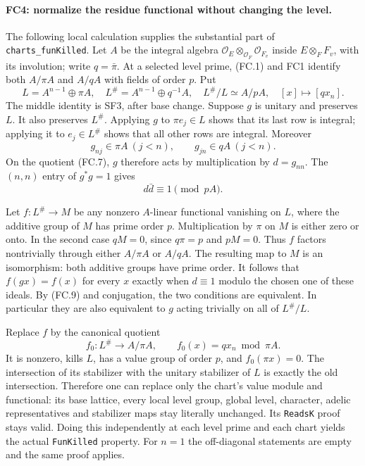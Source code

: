 \documentclass[11pt,a4paper]{article}
\numberwithin{equation}{section}
\theoremstyle{remark}\newtheorem{remark}[theorem]{Remark}
\begin{document}
\paragraph{FC4: normalize the residue functional without changing the
level.}
The following local calculation supplies the substantial part of
\texttt{charts\_\allowbreak funKilled}. Let $A$ be the integral algebra
$\mathcal O_E\otimes_{\mathcal O_F}\mathcal O_{F_v}$ inside
$E\otimes_FF_v$, with its involution; write $q=\bar\pi$.
At a selected level prime, (FC.1) and FC1 identify both $A/\pi A$
and $A/qA$ with fields of order $p$. Put
\[
 L=A^{n-1}\oplus\pi A,\quad
 L^\#=A^{n-1}\oplus q^{-1}A,\quad
 L^\#/L\simeq A/pA,\quad [x]\longmapsto[qx_n].         \tag{FC.7}
\]
The middle identity is SF3, after base change. Suppose $g$ is unitary
and preserves $L$. It also preserves $L^\#$. Applying $g$ to
$\pi e_j\in L$ shows that its last row is integral; applying it to
$e_j\in L^\#$ shows that all other rows are integral. Moreover
\[
 g_{nj}\in\pi A\ (j<n),\qquad
 g_{jn}\in qA\ (j<n).                                 \tag{FC.8}
\]
On the quotient (FC.7), $g$ therefore acts by multiplication by
$d=g_{nn}$. The $(n,n)$ entry of $g^*g=1$ gives
\[
 d\bar d\equiv1\pmod{pA}.                             \tag{FC.9}
\]

Let $f:L^\#\to M$ be any nonzero $A$-linear functional vanishing on
$L$, where the additive group of $M$ has prime order $p$. Multiplication
by $\pi$ on $M$ is either zero or onto. In the second case
$qM=0$, since $q\pi=p$ and $pM=0$. Thus $f$ factors nontrivially
through either $A/\pi A$ or $A/qA$. The resulting map to $M$ is
an isomorphism: both additive groups have prime order. It follows that
$f(gx)=f(x)$ for every $x$ exactly when $d\equiv1$ modulo the
chosen one of these ideals. By (FC.9) and conjugation, the two conditions
are equivalent. In particular they are also equivalent to $g$ acting
trivially on all of $L^\#/L$.

Replace $f$ by the canonical quotient
\[
 f_0:L^\#\longrightarrow A/\pi A,\qquad
 f_0(x)=qx_n\bmod\pi A.                               \tag{FC.10}
\]
It is nonzero, kills $L$, has a value group of order $p$, and
$f_0(\pi x)=0$. The intersection of its stabilizer with the unitary
stabilizer of $L$ is exactly the old intersection. Therefore one can
replace only the chart's value module and functional: its base lattice,
every local level group, global level, character, adelic representatives
and stabilizer maps stay literally unchanged. Its \texttt{ReadsK}
proof stays valid. Doing this independently at each level prime and
each chart yields the actual \texttt{FunKilled} property. For $n=1$
the off-diagonal statements are empty and the same proof applies.
\end{document}
